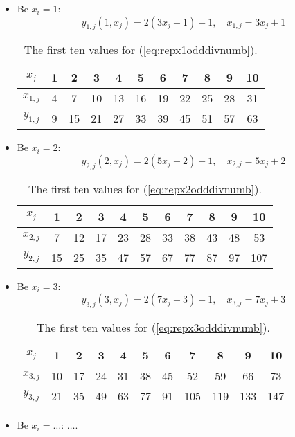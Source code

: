 \begin{itemize}
	\item Be $x_{i} = 1$:
		\begin{equation}
			y_{1,j}\left(1,x_{j}\right) = 2\left(3x_{j} + 1\right) + 1, \quad x_{1,j} = 3x_{j} + 1
		\label{eq:repx1odddivnumb}
		\end{equation}

		\begin{table}[H]
		\centering
		\caption{The first ten values for (\ref{eq:repx1odddivnumb}).}
		\begin{tabular}{c|cccccccccc}
  			$x_{j}$ & 1 & 2 & 3 & 4 & 5 & 6 & 7 & 8 & 9 & 10 \\
  		\hline	$x_{1,j}$ & 4 & 7 & 10 & 13 & 16 & 19 & 22 & 25 & 28 & 31 \\
  			$y_{1,j}$ & 9 & 15 & 21 & 27 & 33 & 39 & 45 & 51 & 57 & 63 \\
		\end{tabular}
		\label{tab:repoddivnumbx1}
		\end{table}

	\item Be $x_{i} = 2$:
		\begin{equation}
			y_{2,j}\left(2,x_{j}\right) = 2\left(5x_{j} + 2\right) + 1, \quad x_{2,j} = 5x_{j} + 2
		\label{eq:repx2odddivnumb}
		\end{equation}

		\begin{table}[H]
		\centering
		\caption{The first ten values for (\ref{eq:repx2odddivnumb}).}
		\begin{tabular}{c|cccccccccc}
  			$x_{j}$ & 1 & 2 & 3 & 4 & 5 & 6 & 7 & 8 & 9 & 10 \\
  		\hline	$x_{2,j}$ & 7 & 12 & 17 & 23 & 28 & 33 & 38 & 43 & 48 & 53 \\
  			$y_{2,j}$ & 15 & 25 & 35 & 47 & 57 & 67 & 77 & 87 & 97 & 107 \\
		\end{tabular}
		\label{tab:repoddivnumbx2}
		\end{table}
	
	\item Be $x_{i} = 3$:
		\begin{equation}
			y_{3,j}\left(3,x_{j}\right) = 2\left(7x_{j} + 3\right) + 1, \quad x_{3,j} = 7x_{j} + 3
		\label{eq:repx3odddivnumb}
		\end{equation}

		\begin{table}[H]
		\centering
		\caption{The first ten values for (\ref{eq:repx3odddivnumb}).}
		\begin{tabular}{c|cccccccccc}
  			$x_{j}$ & 1 & 2 & 3 & 4 & 5 & 6 & 7 & 8 & 9 & 10 \\
  		\hline	$x_{3,j}$ & 10 & 17 & 24 & 31 & 38 & 45 & 52 & 59 & 66 & 73 \\
  			$y_{3,j}$ & 21 & 35 & 49 & 63 & 77 & 91 & 105 & 119 & 133 & 147 \\
		\end{tabular}
		\label{tab:repoddivnumbx3}
		\end{table}
	\item Be $x_{i} = \dots$: $\dots$.
\label{it:repodddivnumb}
\end{itemize}
